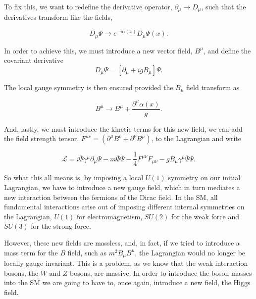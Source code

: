 \documentclass[EPJ,twocolumn]{webofc}
\begin{document}
To fix this, we want to redefine the derivative operator, $\partial_{\mu} \rightarrow D_{\mu} $, such that the derivatives transform like the fields,

\begin{equation}
    D_{\mu}\Psi \rightarrow e^{-i\alpha(x)}D_{\mu}\Psi(x).
\end{equation}

In order to achieve this, we must introduce a new vector field, $B^{\mu}$, and define the covariant derivative
\begin{equation}
    D_{\mu}\Psi = \left[\partial_{\mu}+igB_{\mu} \right]\Psi.
    \label{CovariantDeriv}
\end{equation}

The local gauge symmetry is then ensured provided the $B_{\mu}$ field transform as

\begin{equation}
    B^{\mu} \rightarrow B^{\mu} + \frac{\partial^{\mu}\alpha(x)}{g}.
\end{equation}

And, lastly, we must introduce the kinetic terms for this new field, we can add the field strength tensor, $F^{\mu\nu} = \left( \partial^{\mu}B^{\nu}+ \partial^{\nu}B^{\mu} \right)$, to the Lagrangian and write

\begin{equation}
    \mathcal{L} = i\bar{\Psi}\gamma^{\mu}\partial_{\mu}\Psi -m\bar{\Psi}\Psi-\frac{1}{4}F^{\mu\nu}F_{\mu\nu}-gB_{\mu}\gamma^{\mu}\bar{\Psi}\Psi.
\end{equation}

So what this all means is, by imposing a local $U(1)$ symmetry on our initial Lagrangian, we have to introduce a new gauge field, which in turn mediates a new interaction between the fermions of the Dirac field. In the SM, all fundamental interactions arise out of imposing different internal symmetries on the Lagrangian, $U(1)$ for electromagnetism, $SU(2)$ for the weak force and $SU(3)$ for the strong force. 

However, these new fields are massless, and, in fact, if we tried to introduce a mass term for the $B$ field, such as $m^2B_{\mu}B^{\mu}$, the Lagrangian would no longer be locally gauge invariant. This is a problem, as we know that the weak interaction bosons, the $W$ and $Z$ bosons, are massive. In order to introduce the boson masses into the SM we are going to have to, once again, introduce a new field, the Higgs field.


\end{document}
